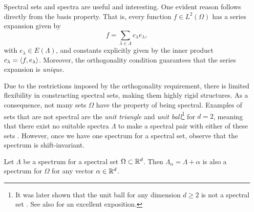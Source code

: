 \documentclass[../thesis.tex]{subfiles}
\begin{document}
Spectral sets and spectra are useful and interesting. One evident reason follows directly from the basis property. That is, every function $f \in L^2(\Omega)$ has a series expansion given by
\begin{equation*}
    f = \sum_{\lambda \in \Lambda} c_{\lambda} e_{\lambda},
\end{equation*}
with $e_\lambda \in E(\Lambda)$, and constants explicitly given by the inner product $c_{\lambda}=\langle f,e_{\lambda}\rangle$. Moreover, the orthogonality condition guarantees that the series expansion is \emph{unique}.

Due to the restrictions imposed by the orthogonality requirement, there is limited flexibility in constructing spectral sets, making them highly rigid structures. As a consequence, not many sets $\Omega$ have the property of being spectral. Examples of sets that are not spectral are the \emph{unit triangle} and \emph{unit ball}\footnote[1]{It was later shown that the unit ball for any dimension $d\geq2$ is not a spectral set \cite{iosevichFourierBasesDistance2001}. See also \cite{kolountzakisPackingTilingOrthogonality2000} for an excellent exposition.} for $d=2$, meaning that there exist no suitable spectra $\Lambda$ to make a spectral pair with either of these sets \cite{fugledeCommutingSelfadjointPartial1974}. However, once we have one spectrum for a spectral set, observe that the spectrum is shift-invariant.
\begin{lemma}\label{lem:spectrum_shift_is_spectrum}
    Let $\Lambda$ be a spectrum for a spectral set $\Omega \subset \mathbb{R}^d$. Then $\Lambda_\alpha = \Lambda + \alpha$ is also a spectrum for $\Omega$ for any vector $\alpha \in \mathbb{R}^d$.
\end{lemma}
\end{document}
